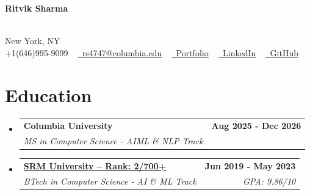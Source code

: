 \documentclass[letterpaper,12pt]{article}
\makeatletter
\newcommand{\resumeSubheading}[4]{
  \vspace{-2pt}\item
    \begin{tabular*}{1.0\textwidth}[t]{l@{\extracolsep{\fill}}r}
      \textbf{#1} & \textbf{\small #2} \\
      \textit{\small#3} & \textit{\small #4}
    \end{tabular*}\vspace{-7pt}
}
\newcommand{\resumeSubHeadingListStart}{\begin{itemize}[leftmargin=0.0in, label={}]}
\newcommand{\resumeSubHeadingListEnd}{\end{itemize}}
\makeatother
\begin{document}


\begin{center}
    \vspace{-60pt}
    {\Large \scshape \raggedright \textbf{Ritvik Sharma}} \\ 
    
    New York, NY \\ 
    \small {+1(646)995-9099} ~ 
    \href{mailto:rs4747@columbia.edu}{\color{blue} \raisebox{-0.2\height}\ \underline{rs4747@columbia.edu}} ~ 
    \href{www.ritvik-sharma.com}{\color{blue} \raisebox{-0.2\height}\ 
    \underline{Portfolio}} ~
    \href{https://www.linkedin.com/in/ritviksharma4/}{\color{blue} \raisebox{-0.2\height}\ \underline{LinkedIn}} ~
    \href{https://github.com/ritviksharma4}{\color{blue} \raisebox{-0.2\height}\ \underline{GitHub}} ~
    \vspace{-12pt}
\end{center}


\section{Education}
  \resumeSubHeadingListStart
    \resumeSubheading
      {Columbia University}{\textnormal{Aug 2025 - Dec 2026}}
      {MS in Computer Science - AIML \& NLP Track}{}
    \vspace{-5pt}
    \resumeSubheading
      {\href{https://github.com/ritviksharma4/My-Certificates/blob/main/My\%20Certificates/Ritvik_SRM_Rank_2_Certificate.pdf}{SRM University -- Rank: 2/700+}}{\textnormal{Jun 2019 - May 2023}}
      {BTech in Computer Science - AI \& ML Track}{GPA: 9.86/10}
  \resumeSubHeadingListEnd
  \vspace{-20pt}
\end{document}
